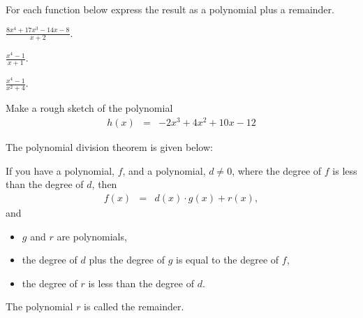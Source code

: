 \begin{problem}
\item For each function below express the result as a polynomial plus
  a remainder.
  \begin{subproblem}
  \item ${\displaystyle \frac{8x^4+17x^3-14x-8}{x+2} }$.
    \vfill
  \item ${\displaystyle \frac{x^4-1}{x+1} }$.
    \vfill
  \item ${\displaystyle \frac{x^4-1}{x^2+4} }$.
    \vfill
  \end{subproblem}

  \clearpage
  
\item Make a rough sketch of the polynomial
  \begin{eqnarray*}
    h(x) & = & -2x^3+4x^2+10x-12
  \end{eqnarray*}


  \vfill

  \clearpage

\item The polynomial division theorem is given below:

  If you have a polynomial, $f$, and a polynomial, $d \neq 0$, where the
  degree of $f$ is less than the degree of $d$, then 
  \begin{eqnarray*}
    f(x) & = & d(x)\cdot g(x) + r(x),
  \end{eqnarray*}
  and
  \begin{itemize}
  \item $g$ and $r$ are polynomials,
  \item the degree of $d$ plus the degree of $g$ is equal to the
    degree of $f$,
  \item the degree of $r$ is less than the degree of $d$.
  \end{itemize}
  The polynomial $r$ is called the remainder.


\end{problem}
